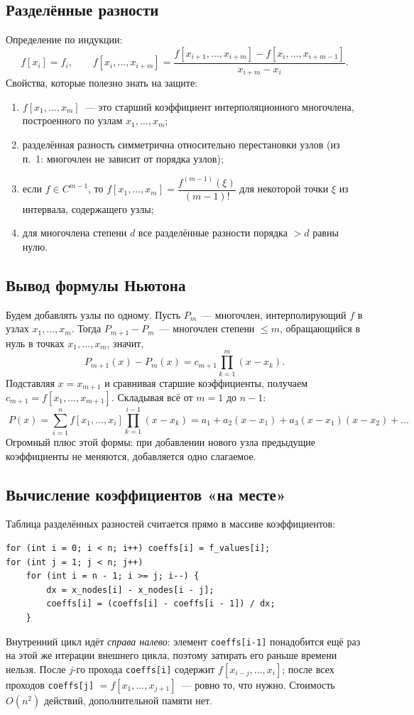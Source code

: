 \documentclass[11pt,a4paper]{report}
\begin{document}
\subsection{Разделённые разности}

Определение по индукции:
\[
f[x_i]=f_i,\qquad
f[x_i,\dots,x_{i+m}]=\frac{f[x_{i+1},\dots,x_{i+m}]-f[x_i,\dots,x_{i+m-1}]}
{x_{i+m}-x_i}.
\]
Свойства, которые полезно знать на защите:
\begin{enumerate}[nosep]
\item $f[x_1,\dots,x_m]$~--- это старший коэффициент интерполяционного
многочлена, построенного по узлам $x_1,\dots,x_m$;
\item разделённая разность симметрична относительно перестановки узлов
(из п.~1: многочлен не зависит от порядка узлов);
\item если $f\in C^{m-1}$, то $f[x_1,\dots,x_m]=\dfrac{f^{(m-1)}(\xi)}{(m-1)!}$
для некоторой точки $\xi$ из интервала, содержащего узлы;
\item для многочлена степени $d$ все разделённые разности порядка $>d$
равны нулю.
\end{enumerate}

\subsection{Вывод формулы Ньютона}

Будем добавлять узлы по одному. Пусть $P_m$~--- многочлен, интерполирующий $f$
в узлах $x_1,\dots,x_m$. Тогда $P_{m+1}-P_m$~--- многочлен степени $\le m$,
обращающийся в нуль в точках $x_1,\dots,x_m$, значит,
\[
P_{m+1}(x)-P_m(x)=c_{m+1}\prod_{k=1}^{m}(x-x_k).
\]
Подставляя $x=x_{m+1}$ и сравнивая старшие коэффициенты, получаем
$c_{m+1}=f[x_1,\dots,x_{m+1}]$. Складывая всё от $m=1$ до $n-1$:
\[
\boxed{\;P(x)=\sum_{i=1}^{n} f[x_1,\dots,x_i]\prod_{k=1}^{i-1}(x-x_k)
= a_1+a_2(x-x_1)+a_3(x-x_1)(x-x_2)+\dots\;}
\]
Огромный плюс этой формы: при добавлении нового узла предыдущие коэффициенты
не меняются, добавляется одно слагаемое.

\subsection{Вычисление коэффициентов «на месте»}

Таблица разделённых разностей считается прямо в массиве коэффициентов:
\begin{lstlisting}[style=cpp]
for (int i = 0; i < n; i++) coeffs[i] = f_values[i];
for (int j = 1; j < n; j++)
    for (int i = n - 1; i >= j; i--) {
        dx = x_nodes[i] - x_nodes[i - j];
        coeffs[i] = (coeffs[i] - coeffs[i - 1]) / dx;
    }
\end{lstlisting}
Внутренний цикл идёт \emph{справа налево}: элемент \texttt{coeffs[i-1]}
понадобится ещё раз на этой же итерации внешнего цикла, поэтому затирать его
раньше времени нельзя. После $j$-го прохода \texttt{coeffs[i]} содержит
$f[x_{i-j},\dots,x_i]$; после всех проходов \texttt{coeffs[j]} $=
f[x_1,\dots,x_{j+1}]$~--- ровно то, что нужно. Стоимость $O(n^2)$ действий,
дополнительной памяти нет.
\end{document}

